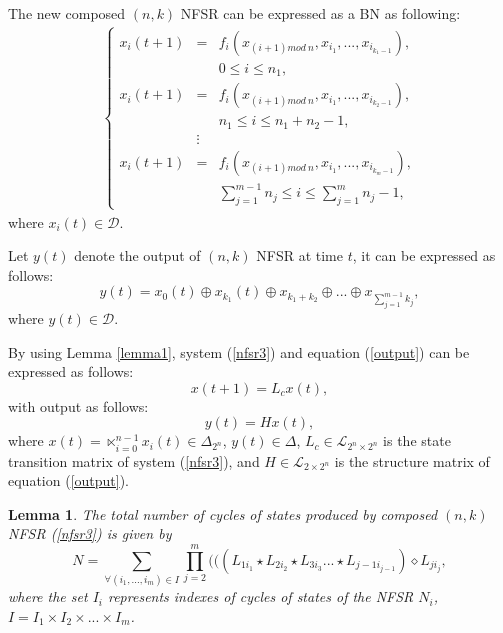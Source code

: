 \documentclass[conference]{IEEEtran}
\newtheorem{lemma}{Lemma}
\begin{document}
The new composed $(n,k)$ NFSR can be expressed as a BN as following:
\begin{eqnarray}\label{nfsr3}
 \left\{ \begin{array}{lll}
x_i(t+1)&=& f_i(x_{(i+1)mod~n},x_{i_1},...,x_{i_{k_1-1}}),\\
&&0\leq i\leq n_1,\\
x_i(t+1)&=&f_i(x_{(i+1)mod~n},x_{i_1},...,x_{i_{k_2-1}}),\\
&&n_1\leq i\leq n_1+n_2-1,\\
&\vdots&\\
x_i(t+1)&=&f_i(x_{(i+1)mod~n},x_{i_1},...,x_{i_{k_m-1}}),\\
&&\sum^{m-1}_{j=1}n_j\leq i\leq \sum^{m}_{j=1}n_j-1,
\end{array} \right.
\end{eqnarray}
where $x_i(t)\in \mathcal{D}$.

Let $y(t)$ denote the output of $(n,k)$ NFSR at time $t$, it can be expressed as follows:
\begin{equation}\label{output}
y(t)=x_0(t)\oplus x_{k_1}(t)\oplus x_{k_1+k_2}\oplus...\oplus x_{\sum^{m-1}_{j=1}k_j},
\end{equation}
where $y(t)\in\mathcal{D}$.

By using Lemma \ref{lemma1}, system (\ref{nfsr3}) and equation (\ref{output}) can be expressed as follows:
\begin{equation}\label{nfsr4}
x(t+1)=L_cx(t),
\end{equation}
with output as follows:
\begin{equation}\label{output1}
y(t)=Hx(t),
\end{equation}
where $x(t)=\ltimes^{n-1}_{i=0}x_i(t)\in \Delta_{2^n}$, $y(t)\in \Delta$, $L_c\in \mathcal{L}_{2^n\times 2^n}$ is the state transition matrix of system (\ref{nfsr3}), and $H\in \mathcal{L}_{2\times 2^n}$ is the structure matrix of equation (\ref{output}).

\begin{lemma}\label{lemma3}\cite{Dubrova2008On}
The total number of cycles of states produced by composed $(n,k)$ NFSR (\ref{nfsr3}) is given by
\begin{equation}
N=\mathop{\sum}\limits_{\forall(i_1,...,i_m)\in I}\prod^m_{j=2}(((L_{1i_1}\star L_{2i_2}\star L_{3i_3}...\star L_{j-1i_{j-1}})\diamond L_{ji_j},
\end{equation}
where the set $I_i$ represents indexes of cycles of states of the NFSR $N_i$, $I=I_1\times I_2\times...\times I_m$.
\end{lemma}
\end{document}
